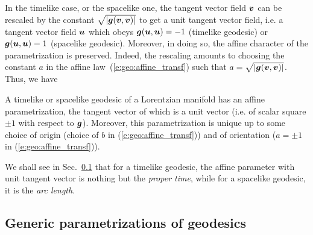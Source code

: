 In the timelike case, or the spacelike one,
the tangent vector field $\bm{v}$ can be rescaled by the constant $\sqrt{|\bm{g}(\bm{v},\bm{v})|}$ to get
a unit tangent vector field, i.e. a tangent vector field $\bm{u}$ which obeys
$\bm{g}(\bm{u},\bm{u}) = -1$ (timelike geodesic) or $\bm{g}(\bm{u},\bm{u}) = 1$
(spacelike geodesic). Moreover, in doing so, the affine character of the
parametrization is preserved. Indeed, the rescaling amounts to choosing the constant $a$
in the affine law~(\ref{e:geo:affine_transf}) such that $a = \sqrt{|\bm{g}(\bm{v},\bm{v})|}$.
Thus, we have
\begin{greybox}
A timelike or spacelike geodesic of a Lorentzian manifold has an affine parametrization,
the tangent vector of which is a unit vector (i.e. of scalar square $\pm 1$ with respect to
$\bm{g}$). Moreover, this parametrization is unique up to some choice of origin
(choice of $b$ in (\ref{e:geo:affine_transf})) and of
orientation ($a=\pm 1$ in (\ref{e:geo:affine_transf})).
\end{greybox}
We shall see in Sec.~\ref{s:geo:gener_param} that for a timelike geodesic,
the affine parameter with unit tangent vector is nothing but the
\emph{proper time}, while for a spacelike
geodesic, it is the \emph{arc length}.

\subsection{Generic parametrizations of geodesics} \label{s:geo:gener_param}

